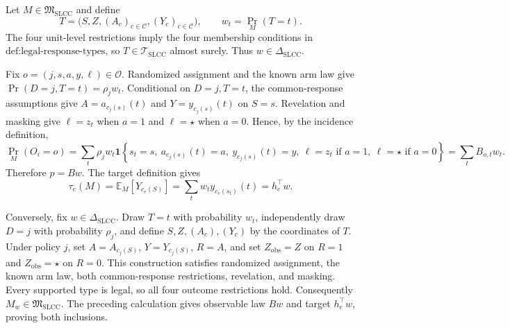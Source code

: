 Let \(M\in\mathfrak M_{\mathrm{SLCC}}\) and define
\[
T=\bigl(S,Z,(A_c)_{c\in\mathcal C},(Y_c)_{c\in\mathcal C}\bigr),\qquad
w_t=\Pr_M(T=t).
\]
The four unit-level restrictions imply the four membership conditions in \(\text{def:legal-response-types}\), so \(T\in\mathcal T_{\mathrm{SLCC}}\) almost surely.  Thus \(w\in\Delta_{\mathrm{SLCC}}\).

Fix \(o=(j,s,a,y,\ell)\in\mathcal O\).  Randomized assignment and the known arm law give \(\Pr(D=j,T=t)=\rho_jw_t\).  Conditional on \(D=j,T=t\), the common-response assumptions give \(A=a_{c_j(s)}(t)\) and \(Y=y_{c_j(s)}(t)\) on \(S=s\).  Revelation and masking give \(\ell=z_t\) when \(a=1\) and \(\ell=\star\) when \(a=0\).  Hence, by the incidence definition,
\[
\Pr_M(O_i=o)
=\sum_t\rho_jw_t\mathbf 1\!\left\{s_t=s,\ a_{c_j(s)}(t)=a,\ y_{c_j(s)}(t)=y,\
\ell=z_t\text{ if }a=1,\ \ell=\star\text{ if }a=0\right\}
=\sum_tB_{o,t}w_t.
\]
Therefore \(p=Bw\).  The target definition gives
\[
\tau_e(M)=\mathbb E_M[Y_{c_e(S)}]
=\sum_tw_ty_{c_e(s_t)}(t)=h_e^{\top}w.
\]

Conversely, fix \(w\in\Delta_{\mathrm{SLCC}}\).  Draw \(T=t\) with probability \(w_t\), independently draw \(D=j\) with probability \(\rho_j\), and define \(S,Z,(A_c),(Y_c)\) by the coordinates of \(T\).  Under policy \(j\), set \(A=A_{c_j(S)}\), \(Y=Y_{c_j(S)}\), \(R=A\), and set \(Z_{\mathrm{obs}}=Z\) on \(R=1\) and \(Z_{\mathrm{obs}}=\star\) on \(R=0\).  This construction satisfies randomized assignment, the known arm law, both common-response restrictions, revelation, and masking.  Every supported type is legal, so all four outcome restrictions hold.  Consequently \(M_w\in\mathfrak M_{\mathrm{SLCC}}\).  The preceding calculation gives observable law \(Bw\) and target \(h_e^{\top}w\), proving both inclusions.